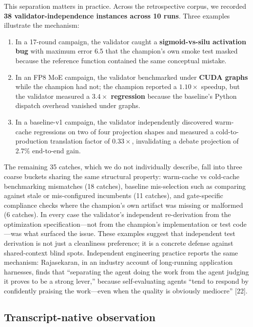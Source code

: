 \documentclass[11pt]{article}
\begin{document}
This separation matters in practice. Across the retrospective corpus, we recorded \textbf{38 validator-independence instances across 10 runs}. Three examples illustrate the mechanism:

\begin{enumerate}[leftmargin=*,itemsep=2pt]
  \item In a 17-round campaign, the validator caught a \textbf{sigmoid-vs-silu activation bug} with maximum error 6.5 that the champion's own smoke test masked because the reference function contained the same conceptual mistake.
  \item In an FP8 MoE campaign, the validator benchmarked under \textbf{CUDA graphs} while the champion had not; the champion reported a $1.10\times$ speedup, but the validator measured a \textbf{$3.4\times$ regression} because the baseline's Python dispatch overhead vanished under graphs.
  \item In a baseline-v1 campaign, the validator independently discovered warm-cache regressions on two of four projection shapes and measured a cold-to-production translation factor of \textbf{$0.33\times$}, invalidating a debate projection of 2.7\% end-to-end gain.
\end{enumerate}

The remaining 35 catches, which we do not individually describe, fall into three coarse buckets sharing the same structural property: warm-cache vs cold-cache benchmarking mismatches (18 catches), baseline mis-selection such as comparing against stale or mis-configured incumbents (11 catches), and gate-specific compliance checks where the champion's own artifact was missing or malformed (6 catches). In every case the validator's independent re-derivation from the optimization specification---not from the champion's implementation or test code---was what surfaced the issue. These examples suggest that independent test derivation is not just a cleanliness preference; it is a concrete defense against shared-context blind spots. Independent engineering practice reports the same mechanism: Rajasekaran, in an industry account of long-running application harnesses, finds that ``separating the agent doing the work from the agent judging it proves to be a strong lever,'' because self-evaluating agents ``tend to respond by confidently praising the work---even when the quality is obviously mediocre'' [22].

\subsection{Transcript-native observation}
\end{document}
